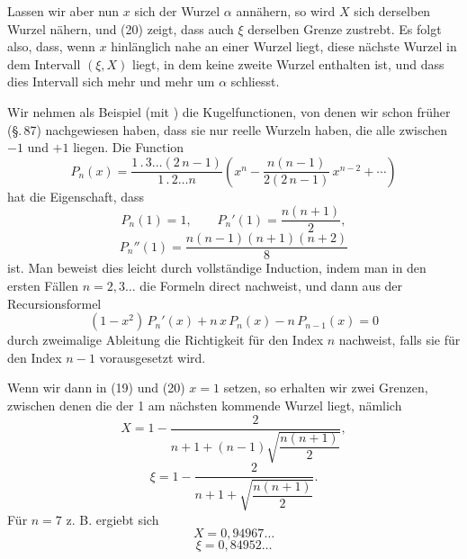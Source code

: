 
Lassen wir aber nun $x$ sich der Wurzel $\alpha$ annähern, so
wird $X$ sich derselben Wurzel nähern, und (20) zeigt, dass auch
$\xi$ derselben Grenze zustrebt. Es folgt also, dass, wenn $x$ hinlänglich
nahe an einer Wurzel liegt, diese nächste Wurzel in
dem Intervall $(\xi, X)$ liegt, in dem keine zweite Wurzel enthalten
ist, und dass dies Intervall sich mehr und mehr um $\alpha$ schliesst.

Wir nehmen als Beispiel (mit ) die Kugelfunctionen,
von denen wir schon früher (\S.\,87) nachgewiesen haben,
dass sie nur reelle Wurzeln haben, die alle zwischen $-1$ und
$+1$ liegen. Die Function
\[
P_n(x) = \frac{1\,.\,3 \ldots (2\,n-1)}{1\,.\,2 \ldots n} \left( x^n - \frac{n(n-1)}{2(2\,n-1)}\,x^{n-2} + \cdots \right)
\]
hat die Eigenschaft, dass
\[
P_n(1) = 1, \qquad P_n'(1) = \frac{n(n+1)}{2},
\]
\[
P_n''(1) = \frac{n(n-1)(n+1)(n+2)}{8}
\]
ist. Man beweist dies leicht durch vollständige Induction, indem
man in den ersten Fällen $n = 2, 3 \ldots$ die Formeln direct
nachweist, und dann aus der Recursionsformel
\[
(1 - x^2)\,P_n'(x) + n\,x\,P_n(x) - n\,P_{n-1}(x) = 0
\]
durch zweimalige Ableitung die Richtigkeit für den Index $n$ nachweist,
falls sie für den Index $n-1$ vorausgesetzt wird.

Wenn wir dann in (19) und (20) $x = 1$ setzen, so erhalten
wir zwei Grenzen, zwischen denen die der 1 am nächsten kommende
Wurzel liegt, nämlich
\[
X = 1 - \frac{2}{n + 1 + (n-1)\sqrt{\dfrac{n(n+1)}{2}}},
\]
\[
\xi = 1 - \frac{2}{n + 1 + \sqrt{\dfrac{n(n+1)}{2}}}.
\]
Für $n = 7$ z. B. ergiebt sich
\[
X = 0{,}94967 \ldots
\]
\[
\xi = 0{,}84952 \ldots
\]
